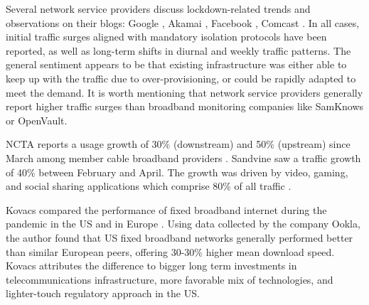 \documentclass[conference,10pt]{IEEEtran}
\begin{document}
Several network service providers discuss lockdown-related trends and observations on their blogs: Google \cite{google}, Akamai \cite{akamai}, Facebook \cite{facebook}, Comcast \cite{comcast}. In all cases, initial traffic surges aligned with mandatory isolation protocols have been reported, as well as long-term shifts in diurnal and weekly traffic patterns. The general sentiment appears to be that existing infrastructure was either able to keep up with the traffic due to over-provisioning, or could be rapidly adapted to meet the demand. It is worth mentioning that network service providers generally report higher traffic surges than broadband monitoring companies like SamKnows or OpenVault.

NCTA reports a usage growth of 30\% (downstream) and 50\% (upstream) since March among member cable broadband providers \cite{ncta}. Sandvine saw a traffic growth of 40\% between February and April. The growth was driven by video, gaming, and social sharing applications which comprise 80\% of all traffic \cite{sandvine}.

Kovacs compared the performance of fixed broadband internet during the pandemic in the US and in Europe \cite{kovacs}. Using data collected by the company Ookla, the author found that US fixed broadband networks generally performed better than similar European peers, offering 30-30\% higher mean download speed. Kovacs attributes the difference to bigger long term investments in telecommunications infrastructure, more favorable mix of technologies, and lighter-touch regulatory approach in the US.


\end{document}
